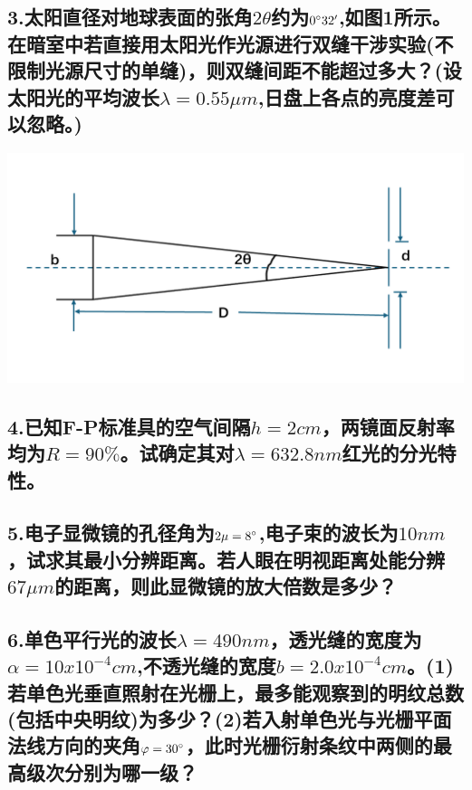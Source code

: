\documentclass[11pt,a4paper]{article}
\begin{document}
    \subsection*{3.太阳直径对地球表面的张角$2\theta$约为$0\degree32'$,如图1所示。在暗室中若直接用太阳光作光源进行双缝干涉实验(不限制光源尺寸的单缝)，则双缝间距不能超过多大？(设太阳光的平均波长$\lambda =0.55\mu m$,日盘上各点的亮度差可以忽略。)}
    \vspace{15mm}
    \includegraphics[scale=0.5]{1.jpg}%
    \subsection*{4.已知F-P标准具的空气间隔$h=2cm$，两镜面反射率均为$R=90\%$。试确定其对$\lambda =632.8nm$红光的分光特性。}
    \vspace{15mm}
    \subsection*{5.电子显微镜的孔径角为$2\mu =8\degree$,电子束的波长为$10nm$，试求其最小分辨距离。若人眼在明视距离处能分辨$67\mu m$的距离，则此显微镜的放大倍数是多少？}
    \vspace{15mm}
    \subsection*{6.单色平行光的波长$\lambda =490nm$，透光缝的宽度为$\alpha=10x10^{-4}cm$,不透光缝的宽度$b=2.0x10^{-4}cm$。(1)若单色光垂直照射在光栅上，最多能观察到的明纹总数(包括中央明纹)为多少？(2)若入射单色光与光栅平面法线方向的夹角$\varphi =30\degree$，此时光栅衍射条纹中两侧的最高级次分别为哪一级？}
    \vspace{15mm}
\end{document}

